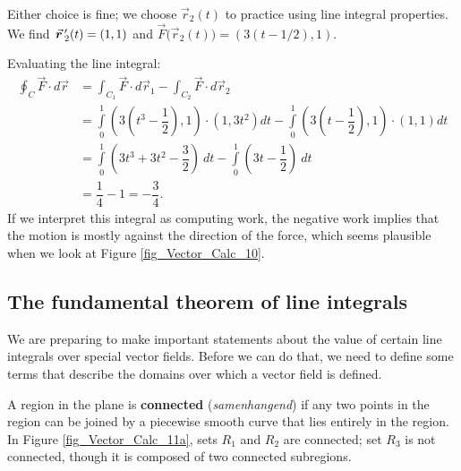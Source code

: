 \begin{example}
Either choice is fine; we choose $\vec r_2(t)$ to practice using line integral properties. We find \linebreak $\vrp_2(t) = \left( 1,1\right)$ and $\vec F\big(\vec r_2(t)\big) = \left( 3(t-1/2),1\right)$.

Evaluating the line integral:
\begin{align*}
\oint_C \vec F\cdot d\vec r &= \int_{C_1}\vec F\cdot d\vec r_1 - \int_{C_2}\vec F\cdot d\vec r_2 \\
			&= \int\limits_0^1 \left( 3\left(t^3-\dfrac{1}{2}\right),1\right)\cdot \left( 1,3t^2\right) dt- \int\limits_0^1 \left( 3\left(t-\dfrac{1}{2}\right),1\right)\cdot \left(1,1\right) dt \\
			&= \int\limits_0^1\left(3t^3+3t^2-\dfrac{3}{2}\right)\ dt - \int\limits_0^1 \left(3t-\dfrac{1}{2}\right)\ dt\\
			&= \dfrac{1}{4} - 1 = -\dfrac{3}{4}.
\end{align*}
If we interpret this integral as computing work, the negative work implies that the motion is mostly against the direction of the force, which seems plausible when we look at Figure \ref{fig_Vector_Calc_10}.
\end{example}

\subsection{The fundamental theorem of line integrals}

	\checkoddpage
{}
We are preparing to make important statements about the value of certain line integrals over special vector fields. Before we can do that, we need to define some terms that describe the domains over which a vector field is defined.

A region in the plane is \textbf{connected} (\textit{samenhangend}) if any two points in the region can be joined by a piecewise smooth curve that lies entirely in the region. In Figure \ref{fig_Vector_Calc_11a}, sets $R_1$ and $R_2$ are connected; set $R_3$ is not connected, though it is composed of two connected subregions.

